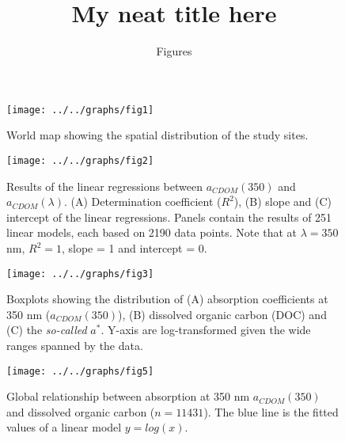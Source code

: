 \documentclass[10pt,a4paper]{scrartcl}
\title{My neat title here}
\subtitle{Figures}
\date{}
\begin{document}
\maketitle

\begin{figure}[h]
	\centering
	\texttt{[image: ../../graphs/fig1]}
	\caption{World map showing the spatial distribution of the study sites.}
\end{figure}

\clearpage
\newpage

\begin{figure}[h]
	\centering
	\texttt{[image: ../../graphs/fig2]}
	\caption{Results of the linear regressions between $a_{CDOM}(350)$ and $a_{CDOM}(\lambda)$. (A) Determination coefficient ($R^2$), (B) slope and (C) intercept of the linear regressions. Panels contain the results of 251 linear models, each based on 2190 data points. Note that at $\lambda = 350$ nm, $R^2 = 1$, slope = 1 and intercept = 0.}
\end{figure}

\clearpage
\newpage

\begin{figure}[h]
	\centering
	\texttt{[image: ../../graphs/fig3]}
	\caption{Boxplots showing the distribution of (A) absorption coefficients at 350 nm ($a_{CDOM}(350)$), (B) dissolved organic carbon (DOC) and (C) the \textit{so-called} $a^*$. Y-axis are log-transformed given the wide ranges spanned by the data.}
\end{figure}

\begin{figure}[h]
	\centering
	\texttt{[image: ../../graphs/fig5]}
	\caption{Global relationship between absorption at 350 nm $a_{CDOM}(350)$ and dissolved organic carbon ($n = 11431$). The blue line is the fitted values of a linear model $y = log(x)$.}
\end{figure}
\end{document}
